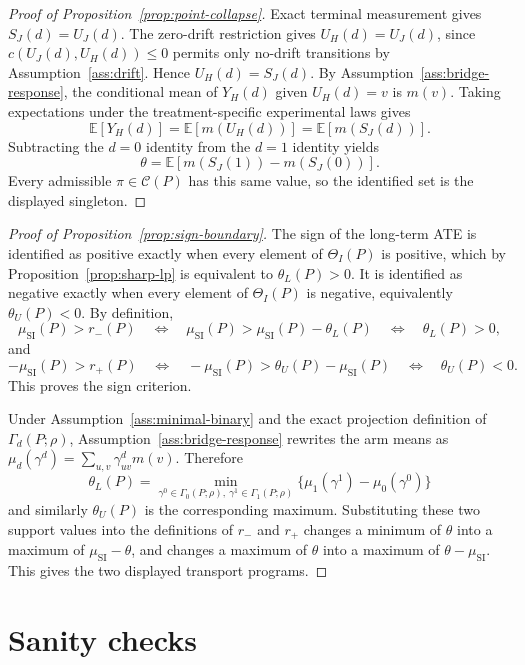 \documentclass[11pt]{article}
\newcommand{\E}{\mathbb{E}}
\theoremstyle{definition}
\theoremstyle{plain}
\theoremstyle{remark}
\begin{document}
\begin{proof}[Proof of Proposition~\ref{prop:point-collapse}]
Exact terminal measurement gives \(S_J(d)=U_J(d)\).  The zero-drift restriction gives \(U_H(d)=U_J(d)\), since \(c(U_J(d),U_H(d))\le0\) permits only no-drift transitions by Assumption~\ref{ass:drift}.  Hence \(U_H(d)=S_J(d)\).  By Assumption~\ref{ass:bridge-response}, the conditional mean of \(Y_H(d)\) given \(U_H(d)=v\) is \(m(v)\).  Taking expectations under the treatment-specific experimental laws gives
\[
  \E[Y_H(d)]
  =
  \E[m(U_H(d))]
  =
  \E[m(S_J(d))].
\]
Subtracting the \(d=0\) identity from the \(d=1\) identity yields
\[
  \theta
  =
  \E[m(S_J(1))-m(S_J(0))].
\]
Every admissible \(\pi\in\mathcal C(P)\) has this same value, so the identified set is the displayed singleton.
\end{proof}

\begin{proof}[Proof of Proposition~\ref{prop:sign-boundary}]
The sign of the long-term ATE is identified as positive exactly when every element of \(\Theta_I(P)\) is positive, which by Proposition~\ref{prop:sharp-lp} is equivalent to \(\theta_L(P)>0\).  It is identified as negative exactly when every element of \(\Theta_I(P)\) is negative, equivalently \(\theta_U(P)<0\).  By definition,
\[
  \mu_{\mathrm{SI}}(P)>r_-(P)
  \quad\Longleftrightarrow\quad
  \mu_{\mathrm{SI}}(P)>\mu_{\mathrm{SI}}(P)-\theta_L(P)
  \quad\Longleftrightarrow\quad
  \theta_L(P)>0,
\]
and
\[
  -\mu_{\mathrm{SI}}(P)>r_+(P)
  \quad\Longleftrightarrow\quad
  -\mu_{\mathrm{SI}}(P)>\theta_U(P)-\mu_{\mathrm{SI}}(P)
  \quad\Longleftrightarrow\quad
  \theta_U(P)<0.
\]
This proves the sign criterion.

Under Assumption~\ref{ass:minimal-binary} and the exact projection definition of \(\Gamma_d(P;\rho)\), Assumption~\ref{ass:bridge-response} rewrites the arm means as \(\mu_d(\gamma^d)=\sum_{u,v}\gamma^d_{uv}m(v)\).  Therefore
\[
  \theta_L(P)
  =
  \min_{\gamma^0\in\Gamma_0(P;\rho),\ \gamma^1\in\Gamma_1(P;\rho)}
  \{\mu_1(\gamma^1)-\mu_0(\gamma^0)\}
\]
and similarly \(\theta_U(P)\) is the corresponding maximum.  Substituting these two support values into the definitions of \(r_-\) and \(r_+\) changes a minimum of \(\theta\) into a maximum of \(\mu_{\mathrm{SI}}-\theta\), and changes a maximum of \(\theta\) into a maximum of \(\theta-\mu_{\mathrm{SI}}\).  This gives the two displayed transport programs.
\end{proof}

\section{Sanity checks}
\end{document}
